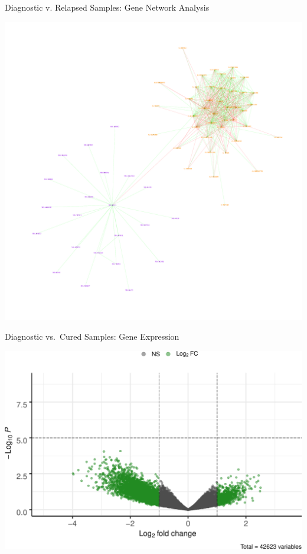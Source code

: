\documentclass[ignorenonframetext,]{beamer}
\begin{document}
\begin{frame}{Diagnostic v. Relapsed Samples: Gene Network Analysis}
\protect\hypertarget{diagnostic-v.-relapsed-samples-gene-network-analysis}{}

\begin{center}\includegraphics[width=0.7\linewidth]{images/DRRNet1} \end{center}

\end{frame}

\begin{frame}{Diagnostic vs.~Cured Samples: Gene Expression}
\protect\hypertarget{diagnostic-vs.cured-samples-gene-expression}{}

\includegraphics[height=0.85\textheight]{final_presentation_slides_files/figure-beamer/DRDC_gene_volcano-1}

\end{frame}
\end{document}
